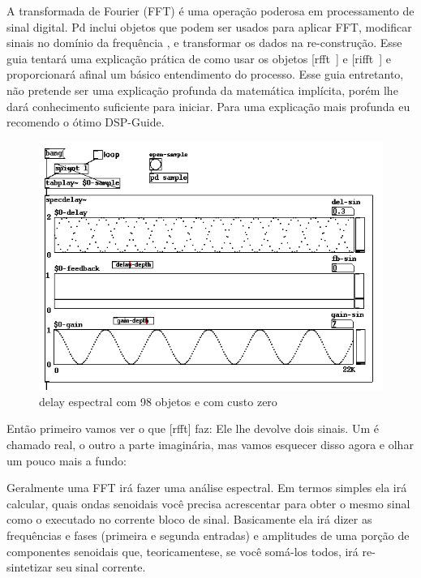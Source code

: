 \documentclass{ppgmus}
\begin{document}
A transformada de Fourier (FFT) é uma operação poderosa em processamento de sinal digital.
Pd inclui objetos que podem ser usados para aplicar FFT, modificar sinais no domínio da frequência , 
e transformar os dados na re-construção. Esse guia tentará uma explicação prática de como usar os 
objetos [rfft~] e [rifft~] e proporcionará afinal um básico entendimento do processo.
Esse guia entretanto, não pretende ser uma explicação profunda da matemática implícita, porém lhe 
dará conhecimento suficiente para iniciar. Para uma explicação mais profunda eu recomendo o ótimo  
DSP-Guide.

\begin{figure}
\includegraphics[scale=.6]{specdelay}
\caption{delay espectral com 98 objetos e com custo zero}
\label{specdelay}
\end{figure}  


Então primeiro vamos ver o que [rfft\texttildelow] faz: Ele lhe devolve dois sinais. 
Um é chamado real, o outro a parte imaginária, mas vamos esquecer disso agora e olhar um pouco mais a fundo:


Geralmente uma FFT irá fazer uma análise espectral. Em termos simples ela irá calcular, quais 
ondas senoidais você precisa acrescentar para obter o mesmo sinal como o executado 
no corrente bloco de sinal. Basicamente ela irá dizer as frequências e fases 
(primeira e segunda entradas) e amplitudes de uma porção de componentes senoidais que, 
teoricamentese, se você somá-los todos, irá re-sintetizar seu sinal corrente.
\end{document}
